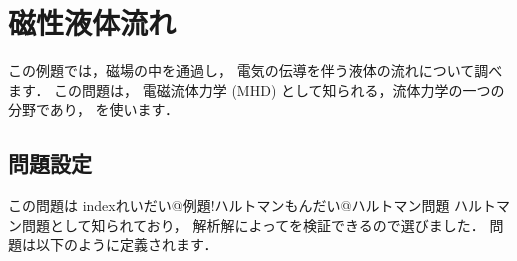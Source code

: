\section{磁性液体流れ}
\label{sec:3.5}
この例題では，磁場の中を通過し，
%
電気の伝導を伴う液体の流れについて調べます．
この問題は，
%
電磁流体力学 (MHD) として知られる，流体力学の一つの分野であり，
%
%
を使います．


\subsection{問題設定}
\label{ssec:3.5.1}
この問題は
index{れいだい@例題!ハルトマンもんだい@ハルトマン問題}%
ハルトマン問題として知られており，
解析解によってを検証できるので選びました．
問題は以下のように定義されます．
